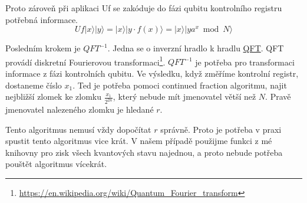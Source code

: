 \documentclass[11pt]{article}
\begin{document}
Proto zároveň při aplikaci Uf se zakóduje do fázi qubitu kontrolního registru potřebná informace.
$$Uf|x\rangle|y\rangle = |x\rangle|y \cdot f(x)\rangle = |x\rangle|ya^x \bmod N \rangle$$
\par Posledním krokem je $QFT^{-1}$.
Jedna se o inverzní hradlo k hradlu \hyperref[sec:qft]{QFT}.
QFT provádí diskretní Fourierovou transformaci\footnote{\url{https://en.wikipedia.org/wiki/Quantum_Fourier_transform}}.
$QFT^{-1}$ je potřeba pro transformaci informace z fázi kontrolních qubitu.
Ve výsledku, když změříme kontrolní registr, dostaneme číslo $x_1$.
Ted je potřeba pomoci continued fraction algoritmu, najit nejbližší zlomek ke zlomku $\frac{x_1}{2^{2n}}$, který nebude mít jmenovatel větší než $N$.
Pravě jmenovatel nalezeného zlomku je hledané $r$.
\par Tento algoritmus nemusí vždy dopočítat $r$ správně.
Proto je potřeba v praxi spustit tento algoritmus vice krát.
V našem případě použijme funkci z mé knihovny pro zisk všech kvantových stavu najednou, a proto nebude potřeba pouštět algoritmus vícekrát.
\end{document}
